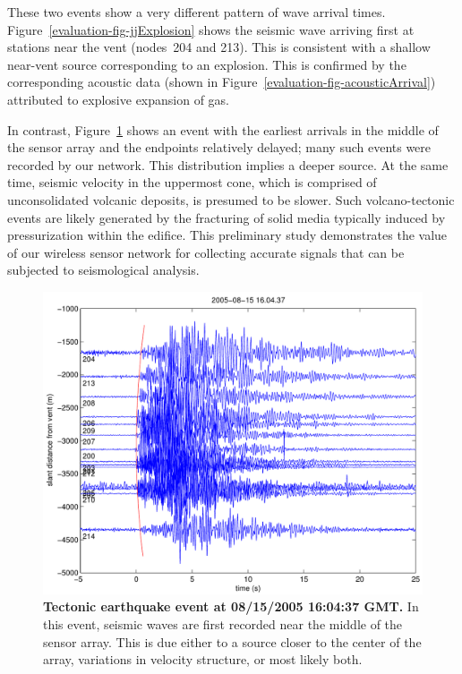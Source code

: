 These two events show a very different pattern of wave arrival times.
Figure~\ref{evaluation-fig-jjExplosion} shows the seismic wave arriving first
at stations near the vent (nodes~204 and 213). This is consistent with a
shallow near-vent source corresponding to an explosion. This is confirmed by
the corresponding acoustic data (shown in
Figure~\ref{evaluation-fig-acousticArrival}) attributed to explosive
expansion of gas. 

In contrast, Figure~\ref{evaluation-fig-jjTectonic} shows an event with the
earliest arrivals in the middle of the sensor array and the endpoints
relatively delayed; many such events were recorded by our network. This
distribution implies a deeper source. At the same time, seismic velocity in
the uppermost cone, which is comprised of unconsolidated volcanic deposits,
is presumed to be slower. Such volcano-tectonic events are likely generated
by the fracturing of solid media typically induced by pressurization within
the edifice. This preliminary study demonstrates the value of our wireless
sensor network for collecting accurate signals that can be subjected to
seismological analysis.

\begin{figure}[t!]
\begin{center}
\includegraphics[width=0.8\hsize]{./5-evaluation/figs/fidelity/seismicArrival/johnson/2005-08-15_16-04-37.pdf}
\end{center}
\caption{\textbf{Tectonic earthquake event at 08/15/2005 16:04:37 GMT.}
In this event, seismic waves are first recorded near the middle of the sensor
array. This is due either to a source closer to the center of the array,
variations in velocity structure, or most likely both.}
\label{evaluation-fig-jjTectonic}
\end{figure}
